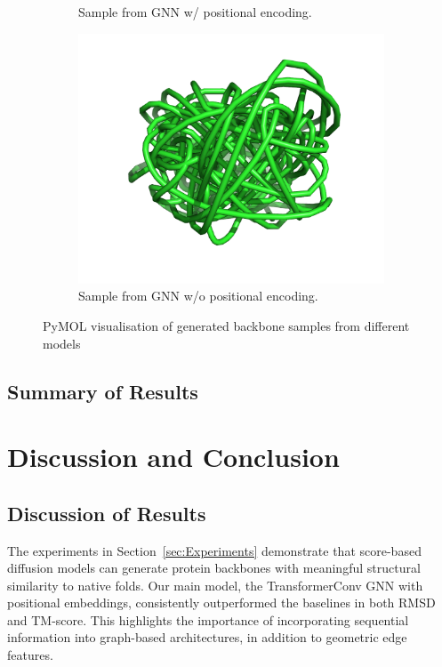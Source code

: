 \documentclass[a4paper,12pt]{article}
\begin{document}
\begin{figure}[htbp]
\begin{subfigure}[b]{0.495\textwidth}
        \caption{Sample from GNN w/ positional encoding.}
        \label{fig:sample-pos}
    \end{subfigure}
    \newline
    \begin{subfigure}[b]{0.475\textwidth}
        \centering
        \includegraphics[width=\linewidth]{1a6fA00_gen_wo_pos.png}
        \caption{Sample from GNN w/o positional encoding.}
        \label{fig:sample-wo-pos}
    \end{subfigure}
    \caption{PyMOL visualisation of generated backbone samples from different models}
    \label{fig:samples}
\end{figure}

\subsection{Summary of Results}\label{subsec:results-summary}

\clearpage

\section{Discussion and Conclusion}\label{sec:Discussion_and_Conclusion}
\subsection{Discussion of Results}\label{subsec:discussion-results}
The experiments in Section~\ref{sec:Experiments} demonstrate that score-based diffusion models can generate protein backbones with meaningful structural similarity to native folds. Our main model, the TransformerConv GNN with positional embeddings, consistently outperformed the baselines in both RMSD and TM-score. This highlights the importance of incorporating sequential information into graph-based architectures, in addition to geometric edge features. 
\end{document}

